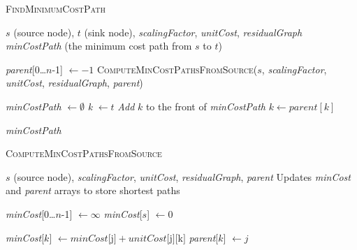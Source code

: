 \documentclass{article}
\begin{document}
\begin{algorithm}[H]
\caption{\textcolor{keywordcolor}{\textsc{FindMinimumCostPath}}}
\begin{algorithmic}[1]
\State {} $s$ (source node), $t$ (sink node), \textit{scalingFactor}, \textit{unitCost}, \textit{residualGraph}
\State {} \textit{minCostPath} (the minimum cost path from $s$ to $t$)

\State {} \textit{parent}[0…$n$-1] $\gets -1$
\State \textcolor{identifiercolor}{\textsc{ComputeMinCostPathsFromSource}}($s$, \textit{scalingFactor}, \textit{unitCost}, \textit{residualGraph}, \textit{parent})

\State {} \textit{minCostPath} $\gets \emptyset$
\State \textit{k} $\gets t$
    \State \textit{Add} $k$ to the front of \textit{minCostPath}
    \State $k \gets \textit{parent}[k]$
\EndWhile

\State \Return \textit{minCostPath}
\end{algorithmic}
\end{algorithm}

\begin{algorithm}[H]
\caption{\textcolor{keywordcolor}{\textsc{ComputeMinCostPathsFromSource}}}
\begin{algorithmic}[1]
\State {} $s$ (source node), \textit{scalingFactor}, \textit{unitCost}, \textit{residualGraph}, \textit{parent}
\State {} Updates \textit{minCost} and \textit{parent} arrays to store shortest paths

\State {} \textit{minCost}[0…$n$-1] $\gets \infty$
\State \textit{minCost}[$s$] $\gets 0$

                        \State \textit{minCost}[$k$] $\gets \textit{minCost}[$j$] + \textit{unitCost}[$j$][$k$]$
                        \State \textit{parent}[$k$] $\gets j$
                    \EndIf
                \EndIf
            \EndIf
        \EndFor
    \EndFor
\EndFor
\end{algorithmic}
\end{algorithm}
\end{document}
